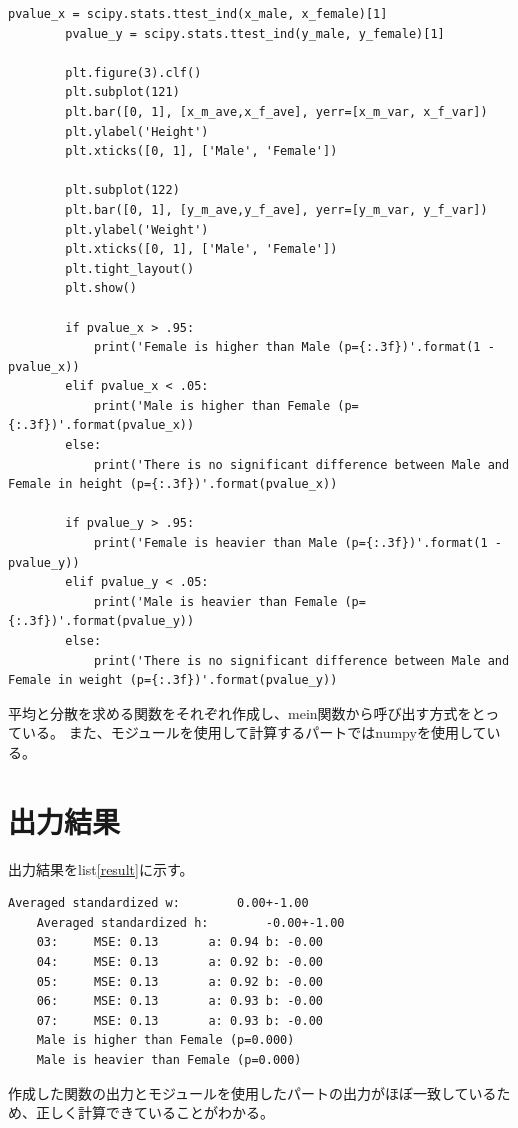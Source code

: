 \documentclass[a4paper]{ltjsarticle}
\begin{document}
\begin{lstlisting}[caption=code,label=code]
        pvalue_x = scipy.stats.ttest_ind(x_male, x_female)[1]
        pvalue_y = scipy.stats.ttest_ind(y_male, y_female)[1]
    
        plt.figure(3).clf()
        plt.subplot(121)
        plt.bar([0, 1], [x_m_ave,x_f_ave], yerr=[x_m_var, x_f_var])
        plt.ylabel('Height')
        plt.xticks([0, 1], ['Male', 'Female'])
        
        plt.subplot(122)
        plt.bar([0, 1], [y_m_ave,y_f_ave], yerr=[y_m_var, y_f_var])
        plt.ylabel('Weight')
        plt.xticks([0, 1], ['Male', 'Female'])
        plt.tight_layout()
        plt.show()
        
        if pvalue_x > .95:
            print('Female is higher than Male (p={:.3f})'.format(1 - pvalue_x))
        elif pvalue_x < .05:
            print('Male is higher than Female (p={:.3f})'.format(pvalue_x))
        else:
            print('There is no significant difference between Male and Female in height (p={:.3f})'.format(pvalue_x))
            
        if pvalue_y > .95:
            print('Female is heavier than Male (p={:.3f})'.format(1 - pvalue_y))
        elif pvalue_y < .05:
            print('Male is heavier than Female (p={:.3f})'.format(pvalue_y))
        else:
            print('There is no significant difference between Male and Female in weight (p={:.3f})'.format(pvalue_y))
\end{lstlisting}

平均と分散を求める関数をそれぞれ作成し、mein関数から呼び出す方式をとっている。
また、モジュールを使用して計算するパートではnumpyを使用している。

\section*{出力結果}
出力結果をlist\ref{result}に示す。
\begin{lstlisting}[caption=output, label=result]
    Averaged standardized w:        0.00+-1.00
    Averaged standardized h:        -0.00+-1.00
    03:     MSE: 0.13       a: 0.94 b: -0.00
    04:     MSE: 0.13       a: 0.92 b: -0.00
    05:     MSE: 0.13       a: 0.92 b: -0.00
    06:     MSE: 0.13       a: 0.93 b: -0.00
    07:     MSE: 0.13       a: 0.93 b: -0.00
    Male is higher than Female (p=0.000)
    Male is heavier than Female (p=0.000)
\end{lstlisting}
作成した関数の出力とモジュールを使用したパートの出力がほぼ一致しているため、正しく計算できていることがわかる。\\
\end{document}
